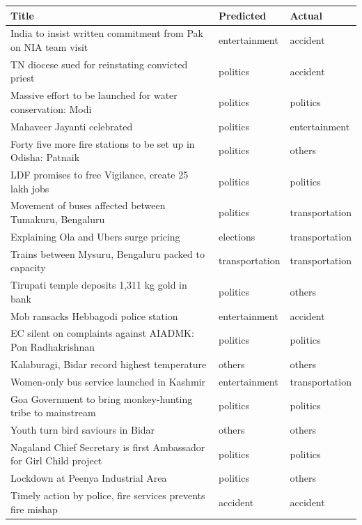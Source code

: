 \begin{table}
\small
\begin{tabular}{ | p{5.4cm}| p{2.0cm} | p{2.0cm} | }
\hline
\textbf{Title} & \textbf{Predicted} & \textbf{Actual} \\
\hline
India to insist written commitment from Pak on NIA team visit & entertainment  & accident  \\
\hline
TN diocese sued for reinstating convicted priest & politics  & accident  \\
\hline
Massive effort to be launched for water conservation: Modi & politics  & politics  \\
\hline
Mahaveer Jayanti celebrated & politics  & entertainment \\
\hline
Forty five more fire stations to be set up in Odisha: Patnaik & politics  & others  \\
\hline
LDF promises to free Vigilance, create 25 lakh jobs & politics  & politics  \\
\hline
Movement of buses affected between Tumakuru, Bengaluru  & politics & transportation \\
\hline
Explaining Ola and Ubers surge pricing & elections  & transportation  \\
\hline
Trains between Mysuru, Bengaluru packed to capacity & transportation  & transportation  \\
\hline
Tirupati temple deposits 1,311 kg gold in bank & politics  & others  \\
\hline
Mob ransacks Hebbagodi police station & entertainment  & accident  \\
\hline
EC silent on complaints against AIADMK: Pon Radhakrishnan & politics  & politics \\
\hline
Kalaburagi, Bidar record highest temperature & others  & others  \\
\hline
Women-only bus service launched in Kashmir & entertainment  & transportation  \\
\hline
Goa Government to bring monkey-hunting tribe to mainstream & politics  & politics  \\
\hline
Youth turn bird saviours in Bidar & others  & others  \\
\hline
Nagaland Chief Secretary is first Ambassador for Girl Child project & politics  & politics \\
\hline
Lockdown at Peenya Industrial Area & politics  & others \\
\hline
Timely action by police, fire services prevents fire mishap & accident  & accident \\

\end{tabular}
\end{table}
